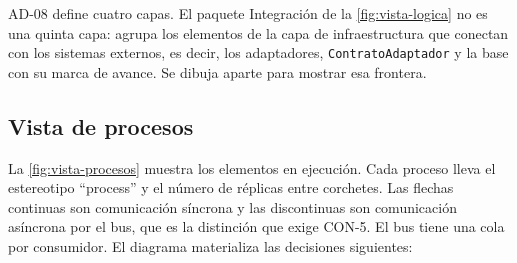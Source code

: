 \documentclass[11pt,letterpaper]{article}
\begin{document}
AD-08 define cuatro capas. El paquete Integración de la \cref{fig:vista-logica} no es una quinta capa:
agrupa los elementos de la capa de infraestructura que conectan con los sistemas externos, es decir,
los adaptadores, \texttt{ContratoAdaptador} y la base con su marca de avance. Se dibuja aparte para
mostrar esa frontera.

\subsection{Vista de procesos}
\label{sec:vista-procesos}

La \cref{fig:vista-procesos} muestra los elementos en ejecución. Cada proceso lleva el estereotipo
\enquote{process} y el número de réplicas entre corchetes. Las flechas continuas son comunicación
síncrona y las discontinuas son comunicación asíncrona por el bus, que es la distinción que exige
CON-5. El bus tiene una cola por consumidor. El diagrama materializa las decisiones siguientes:
\end{document}
